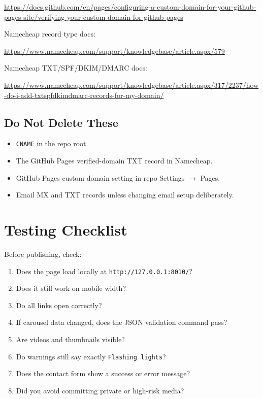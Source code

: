 \documentclass[11pt]{article}
\begin{document}
\url{https://docs.github.com/en/pages/configuring-a-custom-domain-for-your-github-pages-site/verifying-your-custom-domain-for-github-pages}

Namecheap record type docs:

\url{https://www.namecheap.com/support/knowledgebase/article.aspx/579}

Namecheap TXT/SPF/DKIM/DMARC docs:

\url{https://www.namecheap.com/support/knowledgebase/article.aspx/317/2237/how-do-i-add-txtspfdkimdmarc-records-for-my-domain/}

\subsection{Do Not Delete These}

\begin{itemize}
  \item \texttt{CNAME} in the repo root.
  \item The GitHub Pages verified-domain TXT record in Namecheap.
  \item GitHub Pages custom domain setting in repo Settings \(\rightarrow\) Pages.
  \item Email MX and TXT records unless changing email setup deliberately.
\end{itemize}

\section{Testing Checklist}

Before publishing, check:

\begin{enumerate}
  \item Does the page load locally at \texttt{http://127.0.0.1:8010/}?
  \item Does it still work on mobile width?
  \item Do all links open correctly?
  \item If carousel data changed, does the JSON validation command pass?
  \item Are videos and thumbnails visible?
  \item Do warnings still say exactly \texttt{Flashing lights}?
  \item Does the contact form show a success or error message?
  \item Did you avoid committing private or high-risk media?
\end{enumerate}
\end{document}
